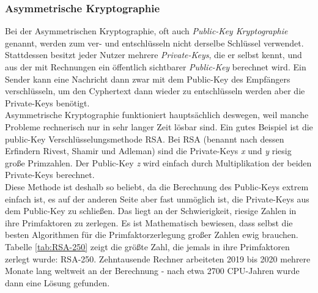 \documentclass[12pt]{article}
\begin{document}
\subsubsection{Asymmetrische Kryptographie}

Bei der Asymmetrischen Kryptographie, oft auch \textit{Public-Key Kryptographie} genannt, werden zum ver- und entschlüsseln nicht derselbe Schlüssel verwendet. Stattdessen besitzt jeder Nutzer mehrere \textit{Private-Keys}, die er selbst kennt, und aus der mit Rechnungen ein öffentlich sichtbarer \textit{Public-Key} berechnet wird. Ein Sender kann eine Nachricht dann zwar mit dem Public-Key des Empfängers verschlüsseln, um den Cyphertext dann wieder zu entschlüsseln werden aber die Private-Keys benötigt. \cite{mavroeidis2018impact} \\

Asymmetrische Kryptographie funktioniert hauptsächlich deswegen, weil manche Probleme rechnerisch nur in sehr langer Zeit lösbar sind. Ein gutes Beispiel ist die public-Key Verschlüsselungsmethode RSA. Bei RSA (benannt nach dessen Erfindern Rivest, Shamir und Adleman) sind die Private-Keys \textit{x} und \textit{y} riesig große Primzahlen. Der Public-Key \textit{z} wird einfach durch Multiplikation der beiden Private-Keys berechnet. \cite{mavroeidis2018impact} \\

Diese Methode ist deshalb so beliebt, da die Berechnung des Public-Keys extrem einfach ist, es auf der anderen Seite aber fast unmöglich ist, die Private-Keys aus dem Public-Key zu schließen. Das liegt an der Schwierigkeit, riesige Zahlen in ihre Primfaktoren zu zerlegen. Es ist Mathematisch bewiesen, dass selbst die besten Algorithmen für die Primfaktorzerlegung großer Zahlen ewig brauchen. \\

Tabelle \ref{tab:RSA-250} zeigt die größte Zahl, die jemals in ihre Primfaktoren zerlegt wurde: RSA-250. Zehntausende Rechner arbeiteten 2019 bis 2020 mehrere Monate lang weltweit an der Berechnung - nach etwa 2700 CPU-Jahren wurde dann eine Lösung gefunden. \cite{RSA250} \cite{RSANumbers}
\end{document}
